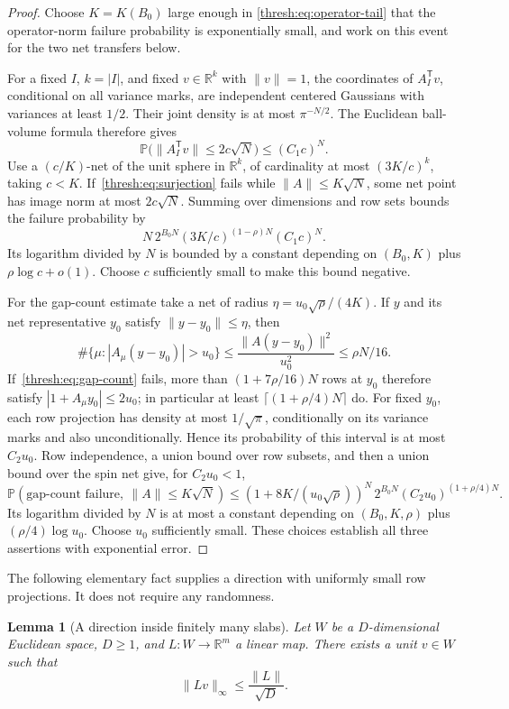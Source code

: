 \documentclass[11pt,a4paper]{article}
\numberwithin{equation}{section}
\newtheorem{lemma}[theorem]{Lemma}
\theoremstyle{definition}
\theoremstyle{remark}
\newcommand{\Prob}{\mathbb P}
\newcommand{\R}{\mathbb R}
\begin{document}
\begin{proof}
Choose $K=K(B_0)$ large enough in
\eqref{thresh:eq:operator-tail} that the operator-norm failure
probability is exponentially small, and work on this event for the two
net transfers below.

For a fixed $I$, $k=|I|$, and fixed $v\in\R^k$ with $\|v\|=1$, the
coordinates of $A_I^{\mathsf T}v$, conditional on all variance marks,
are independent centered Gaussians with variances at least $1/2$.
Their joint density is at most $\pi^{-N/2}$.  The Euclidean ball-volume
formula therefore gives
\[
 \Prob\bigl(\|A_I^{\mathsf T}v\|\leq2c\sqrt N\bigr)
       \leq(C_1c)^N.
\]
Use a $(c/K)$-net of the unit sphere in $\R^k$, of cardinality at most
$(3K/c)^k$, taking $c<K$.  If~\eqref{thresh:eq:surjection} fails while
$\|A\|\leq K\sqrt N$, some net point has image norm at most
$2c\sqrt N$.  Summing over dimensions and row sets bounds the failure
probability by
\[
 N\,2^{B_0N}(3K/c)^{(1-\rho)N}(C_1c)^N.
\]
Its logarithm divided by $N$ is bounded by a constant depending on
$(B_0,K)$ plus $\rho\log c+o(1)$.  Choose $c$ sufficiently small to
make this bound negative.

For the gap-count estimate take a net of radius
$\eta=u_0\sqrt\rho/(4K)$.  If $y$ and its net representative $y_0$
satisfy $\|y-y_0\|\leq\eta$, then
\[
 \#\{\mu:|A_\mu(y-y_0)|>u_0\}
 \leq\frac{\|A(y-y_0)\|^2}{u_0^2}
 \leq\rho N/16.
\]
If~\eqref{thresh:eq:gap-count} fails, more than
$(1+7\rho/16)N$ rows at $y_0$ therefore satisfy
$|1+A_\mu y_0|\leq2u_0$; in particular at least
$\lceil(1+\rho/4)N\rceil$ do.  For fixed $y_0$, each row projection has
density at most $1/\sqrt\pi$, conditionally on its variance marks and
also unconditionally.  Hence its probability of this interval is at
most $C_2u_0$.  Row independence, a union bound over row subsets, and
then a union bound over the spin net give, for $C_2u_0<1$,
\[
 \Prob(\text{gap-count failure},\ \|A\|\leq K\sqrt N)
 \leq
 (1+8K/(u_0\sqrt\rho))^N\,2^{B_0N}
       (C_2u_0)^{(1+\rho/4)N}.
\]
Its logarithm divided by $N$ is at most a constant depending on
$(B_0,K,\rho)$ plus $(\rho/4)\log u_0$.  Choose $u_0$ sufficiently small.
These choices establish all three assertions with exponential error.
\end{proof}

The following elementary fact supplies a direction with uniformly
small row projections.  It does not require any randomness.

\begin{lemma}[A direction inside finitely many slabs]
\label{thresh:slab-direction}
Let $W$ be a $D$-dimensional Euclidean space, $D\geq1$, and
$L:W\to\R^m$ a linear map.  There exists a unit $v\in W$ such that
\begin{equation}
 \|Lv\|_\infty\leq\frac{\|L\|}{\sqrt D}.
 \label{thresh:eq:slab-direction}
\end{equation}
\end{lemma}
\end{document}
